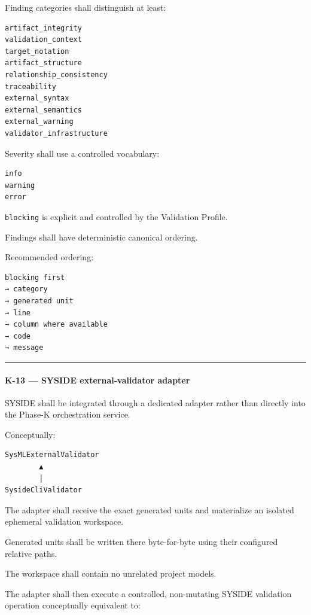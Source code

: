 Finding categories shall distinguish at least:

\begin{verbatim}
artifact_integrity
validation_context
target_notation
artifact_structure
relationship_consistency
traceability
external_syntax
external_semantics
external_warning
validator_infrastructure
\end{verbatim}

Severity shall use a controlled vocabulary:

\begin{verbatim}
info
warning
error
\end{verbatim}

\texttt{blocking} is explicit and controlled by the Validation Profile.

Findings shall have deterministic canonical ordering.

Recommended ordering:

\begin{verbatim}
blocking first
→ category
→ generated unit
→ line
→ column where available
→ code
→ message
\end{verbatim}

\begin{center}\rule{0.5\linewidth}{0.5pt}\end{center}

\hypertarget{k-13--syside-external-validator-adapter}{%
\paragraph{K-13 --- SYSIDE external-validator adapter}\label{k-13--syside-external-validator-adapter}}

SYSIDE shall be integrated through a dedicated adapter rather than directly into the Phase-K orchestration service.

Conceptually:

\begin{verbatim}
SysMLExternalValidator
        ▲
        │
SysideCliValidator
\end{verbatim}

The adapter shall receive the exact generated units and materialize an isolated ephemeral validation workspace.

Generated units shall be written there byte-for-byte using their configured relative paths.

The workspace shall contain no unrelated project models.

The adapter shall then execute a controlled, non-mutating SYSIDE validation operation conceptually equivalent to:

